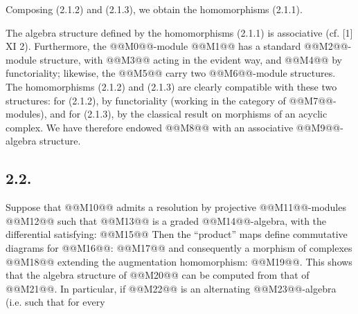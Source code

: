 Composing (2.1.2) and (2.1.3), we obtain the homomorphisms (2.1.1).

The algebra structure defined by the homomorphisms (2.1.1) is associative (cf. [1] XI 2). Furthermore, the @@M0@@-module @@M1@@ has a standard @@M2@@-module structure, with @@M3@@ acting in the evident way, and @@M4@@ by functoriality; likewise, the @@M5@@ carry two @@M6@@-module structures. The homomorphisms (2.1.2) and (2.1.3) are clearly compatible with these two structures: for (2.1.2), by functoriality (working in the category of @@M7@@-modules), and for (2.1.3), by the classical result on morphisms of an acyclic complex. We have therefore endowed @@M8@@ with an associative @@M9@@-algebra structure.

\subsection*{2.2.}
Suppose that @@M10@@ admits a resolution by projective @@M11@@-modules @@M12@@ such that @@M13@@ is a graded @@M14@@-algebra, with the differential satisfying:
@@M15@@
Then the ``product'' maps define commutative diagrams for @@M16@@:
@@M17@@
and consequently a morphism of complexes @@M18@@ extending the augmentation homomorphism: @@M19@@. This shows that the algebra structure of @@M20@@ can be computed from that of @@M21@@. In particular, if @@M22@@ is an alternating @@M23@@-algebra (i.e. such that for every
